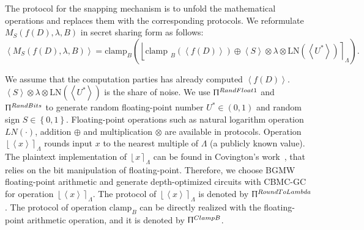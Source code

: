                   The \smpc protocol for the snapping mechanism is to unfold the mathematical operations and replaces them with the corresponding \smpc protocols. We reformulate $M_{S}\left(f\left(D\right),\lambda,B\right)$ in secret sharing form as follows:
                  \begin{equation}
                        \label{eq:snappingMPC}
                        \left\langle M_{S}\left(f\left(D\right) ,\lambda,B\right)\right\rangle =\text{clamp}_{B}\left(\left\lfloor\text {clamp }_{B}\left(\left\langle f\left(D\right)\right\rangle \right) \oplus \left\langle S\right\rangle \otimes \lambda\otimes \text{LN}\left(\left\langle U^{*}\right\rangle \right) \right\rceil_{\Lambda}\right).
                  \end{equation}

                  We assume that the computation parties has already computed $\left\langle f\left(D\right)\right\rangle$. $\left\langle S\right\rangle \otimes \lambda\otimes \text{LN}\left(\left\langle U^{*}\right\rangle \right)$ is the share of noise.
                  We use $\Uppi^{RandFloat1}$ and $\Uppi^{RandBits}$ to generate random floating-point number $ U^{*}\in \left(0,1\right)  $ and random sign $ S\in \left\{0,1\right\}$.
                  Floating-point operations such as natural logarithm operation $LN\left(\cdot\right) $, addition $\oplus$ and multiplication $\otimes$ are available in \smpc protocols.
                  Operation $\left\lfloor \left\langle x\right\rangle \right\rceil_{\Lambda} $ rounds input $x$ to the nearest multiple of $\Lambda$ (a publicly known value).
                  The plaintext implementation of $\left\lfloor x\right\rceil_{\Lambda} $ can be found in Covington's work~\cite{Covington2019}, that relies on the bit manipulation of floating-point. Therefore, we choose BGMW floating-point arithmetic and generate depth-optimized circuits with CBMC-GC for operation $\left\lfloor \left\langle x\right\rangle \right\rceil_{\Lambda} $.
                  The \smpc protocol of $\left\lfloor \left\langle x\right\rangle \right\rceil_{\Lambda} $ is denoted by $\Uppi^{RoundToLambda}$.
                  The \smpc protocol of operation $\text{clamp}_{B}$ can be directly realized with the floating-point arithmetic operation, and it is denoted by $\Uppi^{ClampB}$.

